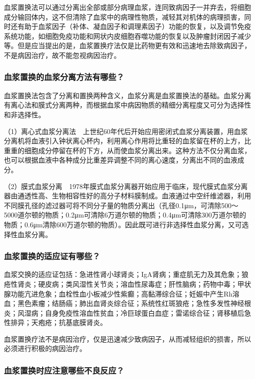 血浆置换法可以通过分离出全部或部分病理血浆，连同致病因子一并弃去，将细胞成分输回体内，这不但清除了血浆中的病理性物质，减轻其对机体的病理损害，同时还有助于血浆因子（补体、凝血因子和调理素因子）功能的恢复，以及调节免疫系统功能，如细胞免疫功能和网状内皮细胞吞噬功能的恢复以及肿瘤封闭因子减少等。但是应当提出的是，血浆置换疗法仅是比药物更有效和迅速地去除致病因子，不是病因治疗，故不能忽视病因治疗。

\subsubsection{血浆置换的血浆分离方法有哪些？}

血浆置换法包含了分离和置换两种含义，血浆分离是血浆置换法的基础。血浆分离有离心法和膜式分离两种，而根据血浆中病因物质的精细分离程度又可分为选择性和非选择性。

（1）离心式血浆分离法　上世纪60年代后开始应用密闭式血浆分离装置，用血浆分离机将血液引入钟状离心杯内，利用离心作用将比重轻的血浆留在杯的上方，比重重的细胞成分停留在杯的下方，从而使血浆分离出来。这种方法不仅分离血浆，也可以根据血液中各种成分比重差异调整不同的离心速度，分离出不同的血液成分。

（2）膜式血浆分离　1978年膜式血浆分离器开始应用于临床，现代膜式血浆分离器由通透性高、生物相容性好的高分子材料膜制成。血液通过中空纤维滤器，利用不同膜孔径的滤过器可将不同分子量的物质分离出（孔径0.1μm，可清除500～5000道尔顿的物质；0.2μm可清除6万道尔顿的物质；0.4μm可清除300万道尔顿的物质；0.6μm清除600万道尔顿的物质）。因此既可进行非选择性血浆分离，又可选择性血浆分离。

\subsubsection{血浆置换的适应证有哪些？}

血浆交换的适应证包括：急进性肾小球肾炎；IgA肾病；重症肌无力及其危象；狼疮性肾炎；硬皮病；类风湿性关节炎；溶血性尿毒症；肝性脑病；药物中毒；甲状腺功能亢进危象；血栓性血小板减少性紫癫；高黏滞综合征；妊娠中产生Rh溶血；黑色素瘤；结肠癌；肺出血肾炎综合征；系统性红斑狼疮；急性多发性神经根炎；风湿病；自身免疫性溶血性贫血；冷巨球蛋白血症；雷诺综合征；肾移植后急性排异；天疱疮；抗基底膜肾炎。

血浆置换疗法不是病因治疗，仅是迅速减少致病因子，从而减轻组织的损害，所以必须进行积极的病因治疗。

\subsubsection{血浆置换时应注意哪些不良反应？}

